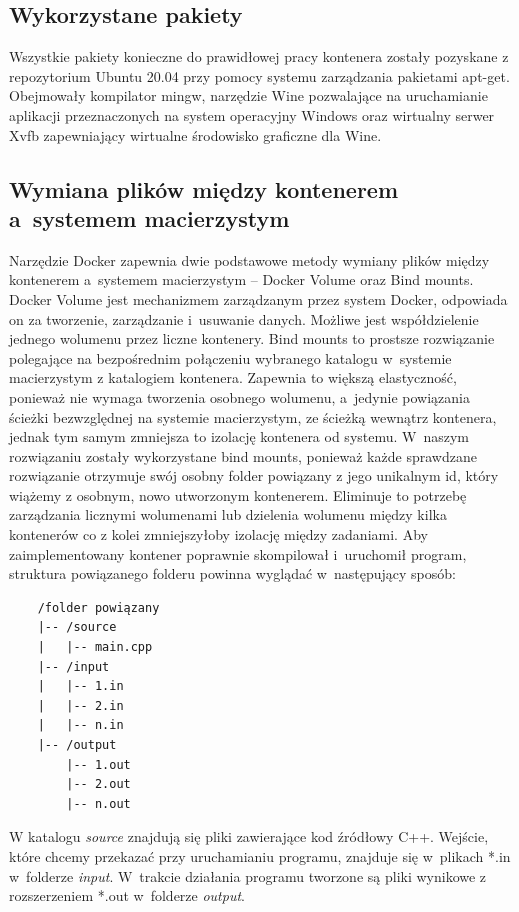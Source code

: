 \subsection{Wykorzystane pakiety}
Wszystkie pakiety konieczne do prawidłowej pracy kontenera zostały pozyskane z repozytorium Ubuntu 20.04 przy pomocy systemu zarządzania pakietami apt-get. Obejmowały kompilator mingw, narzędzie Wine pozwalające na uruchamianie aplikacji przeznaczonych na system operacyjny Windows oraz wirtualny serwer Xvfb zapewniający wirtualne środowisko graficzne dla Wine.

\subsection{Wymiana plików między kontenerem a~systemem macierzystym}
Narzędzie Docker zapewnia dwie podstawowe metody wymiany plików między kontenerem a~systemem macierzystym -- Docker Volume\cite{dockerVolume} oraz Bind mounts\cite{dockerBindMounts}. Docker Volume jest mechanizmem zarządzanym przez system Docker, odpowiada on za tworzenie, zarządzanie i~usuwanie danych. Możliwe jest współdzielenie jednego wolumenu przez liczne kontenery. Bind mounts to prostsze rozwiązanie polegające na bezpośrednim połączeniu wybranego katalogu w~systemie macierzystym z katalogiem kontenera. Zapewnia to większą elastyczność, ponieważ nie wymaga tworzenia osobnego wolumenu, a~jedynie powiązania ścieżki bezwzględnej na systemie macierzystym, ze ścieżką wewnątrz kontenera, jednak tym samym zmniejsza to izolację kontenera od systemu. W~naszym rozwiązaniu zostały wykorzystane bind mounts, ponieważ każde sprawdzane rozwiązanie otrzymuje swój osobny folder powiązany z jego unikalnym id, który wiążemy z osobnym, nowo utworzonym kontenerem. Eliminuje to potrzebę zarządzania licznymi wolumenami lub dzielenia wolumenu między kilka kontenerów co z kolei zmniejszyłoby izolację między zadaniami. Aby zaimplementowany kontener poprawnie skompilował i~uruchomił program, struktura powiązanego folderu powinna wyglądać w~następujący sposób:
\begin{verbatim}
    /folder powiązany
    |-- /source
    |   |-- main.cpp
    |-- /input
    |   |-- 1.in
    |   |-- 2.in
    |   |-- n.in
    |-- /output
        |-- 1.out
        |-- 2.out
        |-- n.out
\end{verbatim}
W katalogu \textit{\/source} znajdują się pliki zawierające kod źródłowy C++. Wejście, które chcemy przekazać przy uruchamianiu programu, znajduje się w~plikach *.in w~folderze \textit{\/input}. W~trakcie działania programu tworzone są pliki wynikowe z rozszerzeniem *.out w~folderze \textit{\/output}. 

